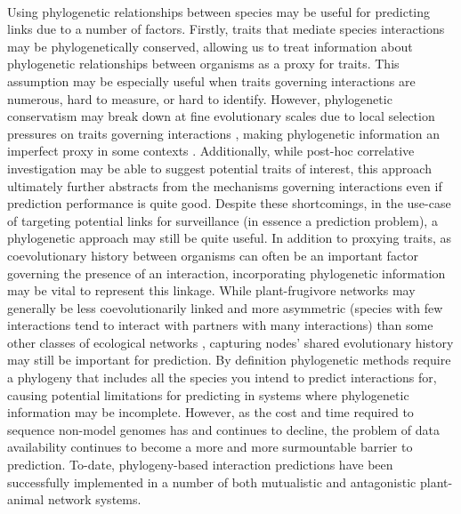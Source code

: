\paragraph*{}
Using phylogenetic relationships between species may be useful for predicting links due to a number of factors. Firstly, traits that mediate species interactions may be phylogenetically conserved, allowing us to treat information about phylogenetic relationships between organisms as a proxy for traits. This assumption may be especially useful when traits governing interactions are numerous, hard to measure, or hard to identify. However, phylogenetic conservatism may break down at fine evolutionary scales due to local selection pressures on traits governing interactions \parencite{perez2007phylogenetic}, making phylogenetic information an imperfect proxy in some contexts \parencite{rafferty2013}. Additionally, while post-hoc correlative investigation may be able to suggest potential traits of interest, this approach ultimately further abstracts from the mechanisms governing interactions even if prediction performance is quite good. Despite these shortcomings, in the use-case of targeting potential links for surveillance (in essence a prediction problem), a phylogenetic approach may still be quite useful. In addition to proxying traits, as coevolutionary history between organisms can often be an important factor governing the presence of an interaction, incorporating phylogenetic information may be vital to represent this linkage. While plant-frugivore networks may generally be less coevolutionarily linked and more asymmetric (species with few interactions tend to interact with partners with many interactions) than some other classes of ecological networks \parencite{wheelwright1982seed, jordano1987patterns, maglianesi2024phylogenetic}, capturing nodes' shared evolutionary history may still be important for prediction. By definition phylogenetic methods require a phylogeny that includes all the species you intend to predict interactions for, causing potential limitations for predicting in systems where phylogenetic information may be incomplete. However, as the cost and time required to sequence non-model genomes has and continues to decline, the problem of data availability continues to become a more and more surmountable barrier to prediction. To-date, phylogeny-based interaction predictions have been successfully implemented in a number of both mutualistic \parencite{Braga21} and antagonistic \parencite{pearse2013predicting} plant-animal network systems.



